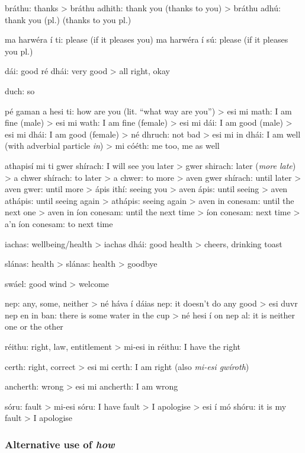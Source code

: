 br\'{a}thu: thanks
> br\'{a}thu adhith: thank you (thanks to you)
> br\'{a}thu adh\'{u}: thank you (pl.) (thanks to you pl.)

ma harw\'{e}ra \'{i} ti: please (if it pleases you)
ma harw\'{e}ra \'{i} s\'{u}: please (if it pleases you pl.)

d\'{a}i: good
r\'{e} dh\'{a}i: very good
> all right, okay

duch: so

p\'{e} gaman a hesi ti: how are you (lit. ``what way are you'')
> esi mi math: I am fine (male)
> esi mi wath: I am fine (female)
> esi mi d\'{a}i: I am good (male)
> esi mi dh\'{a}i: I am good (female)
> n\'{e} dhruch: not bad
> esi mi in dh\'{a}i: I am well (with adverbial particle \textit{in})
> mi c\'{o}\'{e}th: me too, me as well

athapis\'{i} mi ti gwer sh\'{i}rach: I will see you later
> gwer shirach: later (\textit{more late})
> a chwer sh\'{i}rach: to later
> a chwer: to more
> aven gwer sh\'{i}rach: until later
> aven gwer: until more
> \'{a}pis ith\'{i}: seeing you
> aven \'{a}pis: until seeing
> aven ath\'{a}pis: until seeing again
> ath\'{a}pis: seeing again
> aven in conesam: until the next one
> aven in \'{i}on conesam: until the next time
> \'{i}on conesam: next time
> a'n \'{i}on conesam: to next time

iachas: wellbeing/health
> iachas dh\'{a}i: good health > cheers, drinking toast

sl\'{a}nas: health
> sl\'{a}nas: health > goodbye

sw\'{a}el: good wind > welcome

nep: any, some, neither
> n\'{e} h\'{a}va \'{i} d\'{a}ias nep: it doesn't do any good
> esi duvr nep en in ban: there is some water in the cup
> n\'{e} hesi \'{i} on nep al: it is neither one or the other

r\'{e}ithu: right, law, entitlement
> mi-esi in r\'{e}ithu: I have the right

certh: right, correct
> esi mi certh: I am right (also \textit{mi-esi gw\'{i}roth})

ancherth: wrong
> esi mi ancherth: I am wrong

s\'{o}ru: fault
> mi-esi s\'{o}ru: I have fault > I apologise
> esi \'{i} m\'{o} sh\'{o}ru: it is my fault > I apologise

\subsubsection{Alternative use of \textit{how}}

